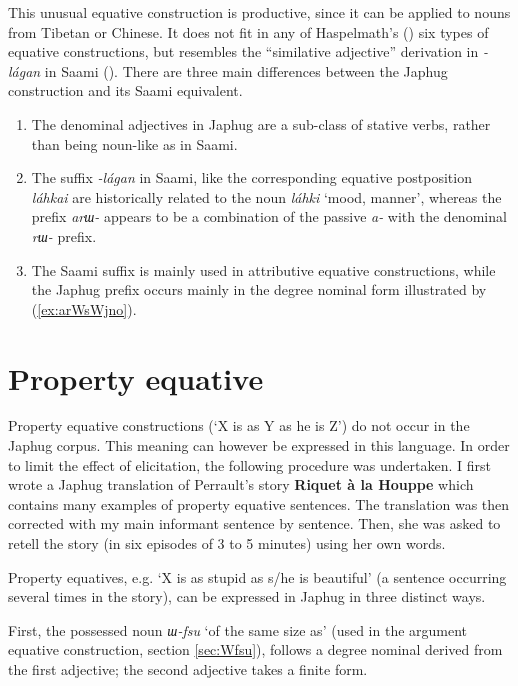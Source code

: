 \documentclass[oneside,a4paper,11pt]{article}
\newcommand{\ipa}[1]{{\phon\textit{#1}}}
\newcommand{\forme}[2]{\ipa{#1} `#2'}
\begin{document}
This unusual equative construction is productive, since it can be applied to nouns from Tibetan or Chinese. It does not fit in any of Haspelmath's (\citeyear{haspelmath17equative}) six types of equative constructions, but resembles the ``similative adjective'' derivation in \ipa{-lágan} in Saami (\citealt[5.1]{ylikovski17similarity}). There are three main differences between the Japhug construction and its Saami equivalent.

\begin{enumerate}
\item The denominal adjectives in Japhug are a sub-class of stative verbs, rather than being noun-like as in Saami.
\item The suffix \ipa{-lágan} in Saami, like the corresponding equative postposition \ipa{láhkai} are historically related to the noun \ipa{láhki} ‘mood, manner’, whereas the prefix \ipa{arɯ-} appears to be a combination of the passive \ipa{a-} with the denominal \ipa{rɯ-} prefix.
\item The Saami suffix is mainly used in attributive equative constructions, while the Japhug prefix occurs mainly in the degree nominal form illustrated by (\ref{ex:arWsWjno}).
\end{enumerate}



\section{Property equative} \label{sec:pred.equative}
Property equative constructions (`X is as Y as he is Z') do not occur in the Japhug corpus. This meaning can however be expressed in this language. In order to limit the effect of elicitation, the following procedure was undertaken. I first wrote a Japhug translation of Perrault's story \textbf{Riquet à la Houppe} which contains many examples of property equative sentences. The translation was then corrected with my main informant sentence by sentence. Then, she was asked to retell the story (in six episodes of 3 to 5 minutes) using her own words.

Property equatives, e.g. `X is as stupid as s/he is beautiful' (a sentence occurring several times in the story), can be expressed in Japhug in three distinct ways.

First, the possessed noun \forme{ɯ-fsu}{of the same size as} (used in the argument equative construction, section \ref{sec:Wfsu}), follows a degree nominal derived from the first adjective; the second adjective takes a finite form.
\end{document}
